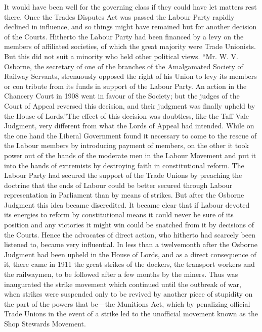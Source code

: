 \documentclass{book}
\begin{document}
It would have been well for the governing class if they could have let matters rest there. Once the Trades Disputes Act was passed the Labour Party rapidly declined in influence, and so things might have remained but for another decision of the Courts. Hitherto the Labour Party had been financed by a levy on the members of affiliated societies, of which the great majority were Trade Unionists. But this did not suit a minority who held other political views. “Mr. W. V. Osborne, the secretary of one of the branches of the Amalgamated Society of Railway Servants, strenuously opposed the right of his Union to levy its members or con tribute from its funds in support of the Labour Party. An action in the Chancery Court in 1908 went in favour of the Society; but the judges of the Court of Appeal reversed this decision, and their judgment was finally upheld by the House of Lords.”\footnotemark[4] The effect of this decision was doubtless, like the Taff Vale Judgment, very different from what the Lords of Appeal had intended. While on the one hand the Liberal Government found it necessary to come to the rescue of the Labour members by introducing payment of members, on the other it took power out of the hands of the moderate men in the Labour Movement and put it into the hands of extremists by destroying faith in constitutional reform. The Labour Party had secured the support of the Trade Unions by preaching the doctrine that the ends of Labour could be better secured through Labour representation in Parliament than by means of strikes. But after the Osborne Judgment this idea became discredited. It became clear that if Labour devoted its energies to reform by constitutional means it could never be sure of its position and any victories it might win could be snatched from it by decisions of the Courts. Hence the advocates of direct action, who hitherto had scarcely been listened to, became very influential. In less than a twelvemonth after the Osborne Judgment had been upheld in the House of Lords, and as a direct consequence of it, there came in 1911 the great strikes of the dockers, the transport workers and the railwaymen, to be followed after a few months by the miners. Thus was inaugurated the strike movement which continued until the outbreak of war, when strikes were suspended only to be revived by another piece of stupidity on the part of the powers that be—the Munitions Act, which by penalizing official Trade Unions in the event of a strike led to the unofficial movement known as the Shop Stewards Movement.
\end{document}
